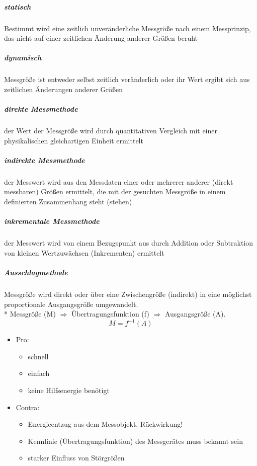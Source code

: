 \documentclass[a4paper]{scrartcl}
\begin{document}
\subparagraph{statisch} Bestimmt wird eine zeitlich unveränderliche Messgröße nach einem Messprinzip, das nicht auf einer zeitlichen Änderung anderer Größen beruht

\subparagraph{dynamisch} Messgröße ist entweder selbst zeitlich veränderlich oder ihr Wert ergibt sich aus zeitlichen Änderungen anderer Größen

\subparagraph{direkte Messmethode} der Wert der Messgröße wird durch quantitativen Vergleich mit einer physikalischen gleichartigen Einheit ermittelt

\subparagraph{indirekte Messmethode} der Messwert wird aus den Messdaten einer oder mehrerer anderer (direkt messbaren) Größen ermittelt, die mit der gesuchten Messgröße in einem definierten Zusammenhang steht (stehen)

\subparagraph{inkrementale Messmethode} der Messwert wird von einem Bezugspunkt aus durch Addition oder Subtraktion von kleinen Wertzuwächsen (Inkrementen) ermittelt

\subparagraph{Ausschlagmethode} Messgröße wird direkt oder über eine Zwischengröße (indirekt) in eine möglichst proportionale Ausgangsgröße umgewandelt.\\*
Messgröße (M) $\Rightarrow$ Übertragungsfunktion (f) $\Rightarrow$ Ausgangsgröße (A).
\[ M = f^{-1} (A)\]
\begin{itemize}
\item Pro:
\begin{itemize}
\item schnell
\item einfach
\item keine Hilfsenergie benötigt
\end{itemize}
\item Contra:
\begin{itemize}
\item Energieentzug aus dem Messobjekt, Rückwirkung!
\item Kennlinie (Übertragungsfunktion) des Messgerätes muss bekannt sein
\item starker Einfluss von Störgrößen
\end{itemize}
\end{itemize}
\end{document}
